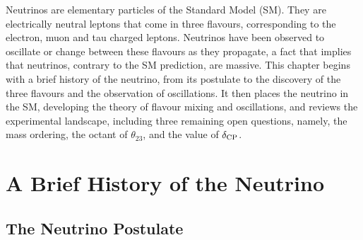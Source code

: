 Neutrinos are elementary particles of the Standard Model (SM). They are electrically neutral leptons that come 
in three flavours, corresponding to the electron, muon and tau charged leptons. Neutrinos have been observed to oscillate or change between these flavours as they propagate, a fact that implies that neutrinos, contrary to the SM prediction, are massive. This chapter begins with a brief history of the neutrino, from its postulate to the discovery of the three flavours and the observation of oscillations. It then places the neutrino in the SM, developing the theory of flavour mixing and oscillations, and reviews the experimental landscape, including three remaining open questions, namely, the mass ordering, the octant of $\theta_{23}$, and the value of $\delta_{\rm CP}$.

\section{A Brief History of the Neutrino}
\label{sec:history}

\subsection{The Neutrino Postulate}

